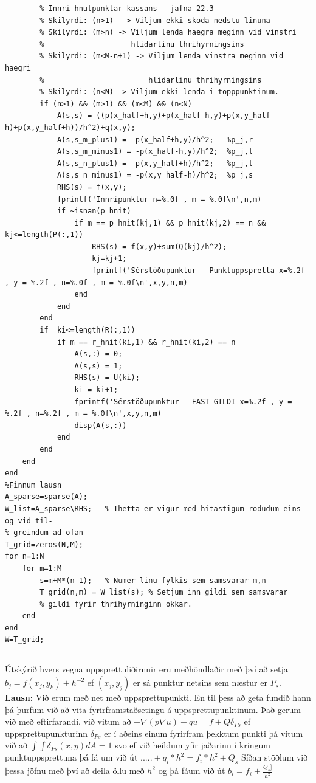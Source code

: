 \documentclass[11pt,a4paper,titlepage]{article}
\begin{document}
\begin{verbatim}
        % Innri hnutpunktar kassans - jafna 22.3
        % Skilyrdi: (n>1)  -> Viljum ekki skoda nedstu linuna
        % Skilyrdi: (m>n) -> Viljum lenda haegra meginn vid vinstri
        %                    hlidarlinu thrihyrningsins
        % Skilyrdi: (m<M-n+1) -> Viljum lenda vinstra meginn vid haegri
        %                        hlidarlinu thrihyrningsins
        % Skilyrdi: (n<N) -> Viljum ekki lenda i topppunktinum.
        if (n>1) && (m>1) && (m<M) && (n<N)
            A(s,s) = ((p(x_half+h,y)+p(x_half-h,y)+p(x,y_half-h)+p(x,y_half+h))/h^2)+q(x,y);
            A(s,s_m_plus1) = -p(x_half+h,y)/h^2;   %p_j,r
            A(s,s_m_minus1) = -p(x_half-h,y)/h^2;  %p_j,l
            A(s,s_n_plus1) = -p(x,y_half+h)/h^2;   %p_j,t
            A(s,s_n_minus1) = -p(x,y_half-h)/h^2;  %p_j,s
            RHS(s) = f(x,y);
            fprintf('Innripunktur n=%.0f , m = %.0f\n',n,m)
            if ~isnan(p_hnit)
                if m == p_hnit(kj,1) && p_hnit(kj,2) == n && kj<=length(P(:,1))
                    RHS(s) = f(x,y)+sum(Q(kj)/h^2);
                    kj=kj+1;
                    fprintf('Sérstöðupunktur - Punktuppspretta x=%.2f , y = %.2f , n=%.0f , m = %.0f\n',x,y,n,m)
                end
            end
        end
        if  ki<=length(R(:,1))
            if m == r_hnit(ki,1) && r_hnit(ki,2) == n 
                A(s,:) = 0;
                A(s,s) = 1;
                RHS(s) = U(ki);
                ki = ki+1;
                fprintf('Sérstöðupunktur - FAST GILDI x=%.2f , y = %.2f , n=%.2f , m = %.0f\n',x,y,n,m)
                disp(A(s,:))
            end
        end
    end
end
%Finnum lausn
A_sparse=sparse(A);
W_list=A_sparse\RHS;   % Thetta er vigur med hitastigum rodudum eins og vid til-
% greindum ad ofan
T_grid=zeros(N,M);
for n=1:N
    for m=1:M
        s=m+M*(n-1);   % Numer linu fylkis sem samsvarar m,n
        T_grid(n,m) = W_list(s); % Setjum inn gildi sem samsvarar
        % gildi fyrir thrihyrninginn okkar.
    end
end
W=T_grid;

\end{verbatim}
\subsection{}
Útskýrið hvers vegna uppsprettuliðirnnir eru meðhöndlaðir með því að setja $b_{j} = f(x_{j},y_{k})+h^{-2}$ ef $(x_{j},y_{j})$ er sá punktur netsins sem næstur er $P_s$.  
\textbf{Lausn:}
Við erum með net með uppsprettupunkti.  En til þess að geta fundið hann þá þurfum við að vita fyrirframstaðsetingu á uppsprettupunktinum. 
Það gerum við með eftirfarandi.
við vitum að  
$-\nabla(p \nabla u) + qu= f +Q \delta_{Ps}$ 
ef uppsprettupunkturinn $\delta_{Ps}$ er í aðeins einum fyrirfram þekktum punkti þá vitum við að 
$\int \int \delta_{Ps}(x,y)dA=1$ 
 svo ef við heildum yfir jaðarinn í kringum punktuppsprettuna þá fá um við út 
 $.....+q_i*h^2=f_i*h^2+Q_s$
 Síðan stöðlum við þessa jöfnu með því að deila öllu með $h^2$
 og þá fáum við út 
 $b_i= f_i+\frac{Q_s]}{h^2}$
\end{document}
